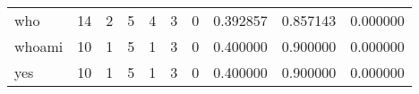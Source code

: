 \begin{longtable}{lrrrrrrrrr}
who       &                                       14 &                                                  2 &                                                  5 &                                                  4 &                                                  3 &                                                  0 &                                           0.392857 &                               0.857143 &                             0.000000 \\
whoami    &                                       10 &                                                  1 &                                                  5 &                                                  1 &                                                  3 &                                                  0 &                                           0.400000 &                               0.900000 &                             0.000000 \\
yes       &                                       10 &                                                  1 &                                                  5 &                                                  1 &                                                  3 &                                                  0 &                                           0.400000 &                               0.900000 &                             0.000000 \\
\end{longtable}
